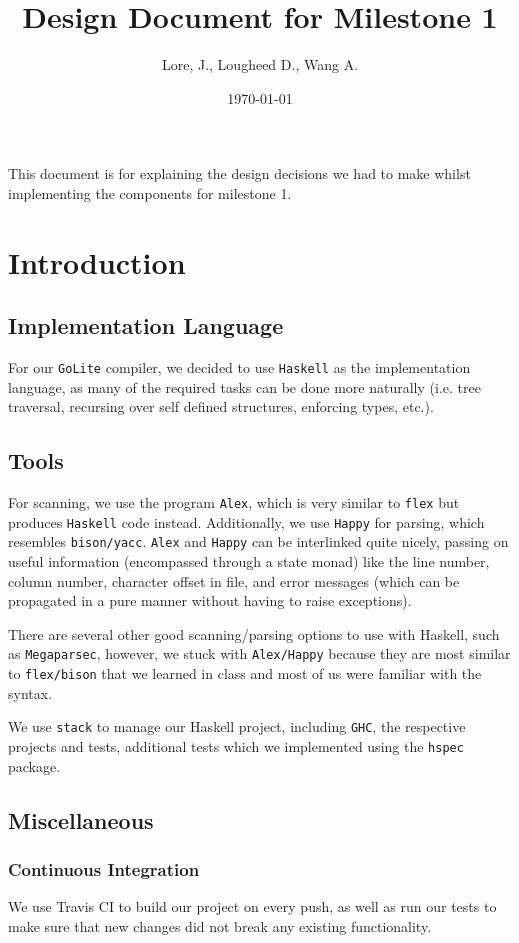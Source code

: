 \documentclass[11pt]{article}
\author{Lore, J., Lougheed D., Wang A.}
\date{\today}
\title{Design Document for Milestone 1}
\begin{document}
\maketitle
\tableofcontents

This document is for explaining the design decisions we had to make
whilst implementing the components for milestone 1.
\section{Introduction}
\label{sec:org4d3385e}
\subsection{Implementation Language}
\label{sec:org4c5c0c6}
For our \texttt{GoLite} compiler, we decided to use \texttt{Haskell} as the
implementation language, as many of the required tasks can be done
more naturally (i.e. tree traversal, recursing over self defined
structures, enforcing types, etc.).
\subsection{Tools}
\label{sec:org4c89b6b}
For scanning, we use the program \texttt{Alex}, which is very similar to \texttt{flex}
but produces \texttt{Haskell} code instead. Additionally, we use \texttt{Happy} for
parsing, which resembles \texttt{bison/yacc}. \texttt{Alex} and \texttt{Happy} can be interlinked
quite nicely, passing on useful information (encompassed
through a state monad) like the line number, column number, character
offset in file, and error messages (which can be propagated in a pure manner
without having to raise exceptions).

There are several other good scanning/parsing options to use with
Haskell, such as \texttt{Megaparsec}, however, we stuck with \texttt{Alex/Happy} because
they are most similar to \texttt{flex/bison} that we learned in class and most
of us were familiar with the syntax.

We use \texttt{stack} to manage our Haskell project, including \texttt{GHC}, the
respective projects and tests, additional tests which we implemented
using the \texttt{hspec} package.
\subsection{Miscellaneous}
\label{sec:org32b68d8}
\subsubsection{Continuous Integration}
\label{sec:org2448d5d}
We use Travis CI to build our project on every push, as well as
run our tests to make sure that new changes did not break any
existing functionality.
\end{document}
